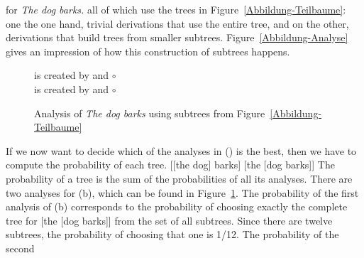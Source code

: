 for \emph{The dog
  barks.} all of which use the trees in Figure~\ref{Abbildung-Teilbaume}: 
  one the one hand, trivial derivations that use the entire tree, and on the other, derivations that
  build trees from smaller subtrees.
Figure~\vref{Abbildung-Analyse} gives an impression of how this construction of subtrees happens.
\begin{figure}
\hfill
{}
is created by
and
$\circ$
\hfill\mbox{}
\\[3ex]
\hfill{}
is created by
and
$\circ$
\hfill\mbox{}
\caption{\label{Abbildung-Analyse}Analysis of \emph{The dog barks} using subtrees from Figure~\ref{Abbildung-Teilbaume}}
\end{figure}%
If we now want to decide which of the analyses in () is the best, then we have to compute the probability of each tree.
\eal
\ex {}[[the dog] barks]
\ex {}[the [dog barks]]
\zl
The probability of a tree is the sum of the probabilities of all its analyses.
There are two analyses for (b), which can be found in Figure~\ref{Abbildung-Analyse}.
The probability of the first analysis of (b) corresponds to the probability of choosing exactly the complete tree for [the [dog barks]] from
the set of all subtrees. Since there are twelve subtrees, the probability of choosing that one is 1/12. The probability of the second
